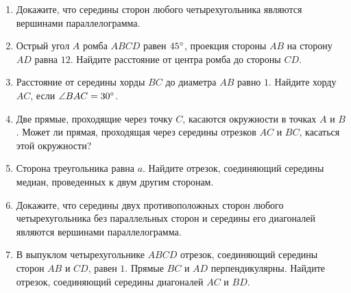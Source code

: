 \documentclass[12pt, a4paper]{article}
\begin{document}
	
	\begin{enumerate}
		\item \textit{} Докажите, что середины сторон любого четырехугольника являются вершинами параллелограмма.
		\item \textit{} Острый угол $A$ ромба $ABCD$ равен $45\degree$, проекция стороны $AB$ на сторону $AD$ равна $12$. Найдите расстояние от центра ромба до стороны $CD$.
		\item \textit{} Расстояние от середины хорды $BC$ до диаметра $AB$ равно $1$. Найдите хорду $AC$, если $\angle BAC = 30 \degree$.

		\item \textit{} Две прямые, проходящие через точку $C$, касаются окружности в точках $A$ и $B$. Может ли прямая, проходящая через середины отрезков $AC$ и $BC$, касаться этой окружности?
		\item \textit{} Сторона треугольника равна $a$. Найдите отрезок, соединяющий середины медиан, проведенных к двум другим сторонам.
		\item \textit{} Докажите, что середины двух противоположных сторон любого четырехугольника без параллельных сторон и середины его диагоналей являются вершинами параллелограмма.
		\item \textit{} В выпуклом четырехугольнике $ABCD$ отрезок, соединяющий середины сторон $AB$ и $CD$, равен $1$. Прямые $BC$ и $AD$ перпендикулярны. Найдите отрезок, соединяющий середины диагоналей $AC$ и $BD$.
	\end{enumerate}
\end{document}
